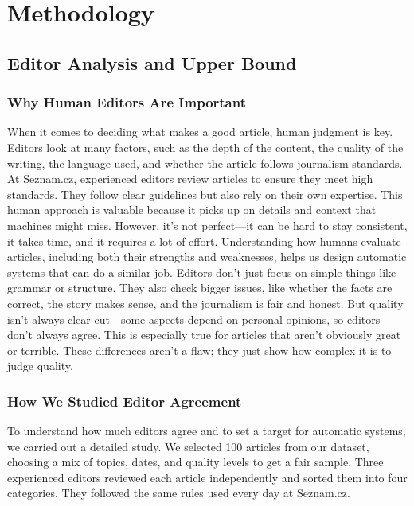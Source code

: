 
\chapter{Methodology\label{chap:methodology}}

\section{Editor Analysis and Upper Bound}\label{sec:editor_analysis}

\subsection{Why Human Editors Are Important}

When it comes to deciding what makes a good article, human judgment is key. Editors look at many factors, such as the depth of the content, the quality of the writing, the language used, and whether the article follows journalism standards. At Seznam.cz, experienced editors review articles to ensure they meet high standards. They follow clear guidelines but also rely on their own expertise. This human approach is valuable because it picks up on details and context that machines might miss. However, it's not perfect—it can be hard to stay consistent, it takes time, and it requires a lot of effort. Understanding how humans evaluate articles, including both their strengths and weaknesses, helps us design automatic systems that can do a similar job.
Editors don't just focus on simple things like grammar or structure. They also check bigger issues, like whether the facts are correct, the story makes sense, and the journalism is fair and honest. But quality isn't always clear-cut—some aspects depend on personal opinions, so editors don't always agree. This is especially true for articles that aren't obviously great or terrible. These differences aren't a flaw; they just show how complex it is to judge quality.

\subsection{How We Studied Editor Agreement}
To understand how much editors agree and to set a target for automatic systems, we carried out a detailed study. We selected 100 articles from our dataset, choosing a mix of topics, dates, and quality levels to get a fair sample. Three experienced editors reviewed each article independently and sorted them into four categories. They followed the same rules used every day at Seznam.cz.
